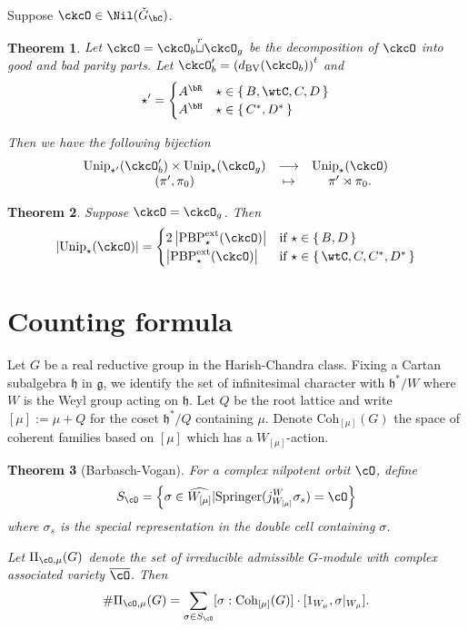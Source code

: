 \documentclass[12pt,a4paper]{amsart}
\def\abs#1{\left|{#1}\right|}
\numberwithin{equation}{section}
\newtheorem{thm}{Theorem}[section]
\theoremstyle{remark}
\def\Unip{\mathrm{Unip}}
\def\ckG{\check{G}}
\def\dBV{d_{\mathrm{BV}}}
\def\cuprow{{\stackrel{r}{\sqcup}}}
\def\Spr{\mathrm{Springer}}
\def\PBPes{\mathrm{PBP}^{\mathrm{ext}}_{\star}}
\begin{document}
Suppose $\ckcO\in \Nil(\ckG_{\bC})$.

\begin{thm}
  Let
  $\ckcO = \ckcO_{b}\cuprow \ckcO_{g}$ be the decomposition of $\ckcO$ into
  good and bad parity parts.
  Let $\ckcO'_{b} = \left(\dBV(\ckcO_{b})\right)^{t}$ and
  \[\star' =
  \begin{cases}
     A^{\bR} & \star \in \set{B,\wtC,C,D}\\
     A^{\bH} & \star \in \set{C^{*},D^{*}}\\
    \end{cases}
  \]

  Then we have the following bijection
  \[
    \begin{array}{ccc}
    \Unip_{\star'}(\ckcO'_{b}) \times \Unip_{\star}(\ckcO_{g})
      & \longrightarrow & \Unip_{\star}(\ckcO)\\
      (\pi',\pi_{0})& \mapsto & \pi'\rtimes \pi_{0}.
    \end{array}
  \]
\end{thm}

\begin{thm}
  Suppose $\ckcO = \ckcO_{g}$. Then
  \[
    \abs{\Unip_{\star}(\ckcO)} = \begin{cases}
      2 \abs{\PBPes(\ckcO)} & \text{if } \star \in \set{B,D}\\
      \abs{\PBPes(\ckcO)} & \text{if } \star \in \set{\wtC,C,C^{*}, D^{*}}
      \end{cases}
  \]
\end{thm}


\section{Counting formula}

Let $G$ be a real reductive group in the Harish-Chandra class.
Fixing a Cartan subalgebra $\mathfrak h$ in $\mathfrak g$,
we identify the set of infinitesimal character with $\mathfrak h^{*}/W$
where $W$ is the Weyl group acting on $\mathfrak h$.
Let $Q$ be the root lattice and write $[\mu]:= \mu+Q$ for the coset
$\mathfrak h^{*}/Q$ containing $\mu$.
Denote
$\mathrm{Coh}_{[\mu]}(G)$ the space of coherent families based on $[\mu]$ which has a $W_{[\mu]}$-action.

\begin{thm}[Barbasch-Vogan]\label{thm:count}
  For a complex nilpotent orbit $\cO$,
  define
  \[
    S_{\cO} = \left\{\sigma \in \widehat{W_{[\mu]}}|
      \Spr(j_{W_{[\mu]}}^{W} \sigma_{s}) = \cO
    \right\}
  \]
  where $\sigma_{s}$ is the special representation in the double cell containing
  $\sigma$.

  Let $\Pi_{\cO,\mu}(G)$ denote the set of irreducible admissible $G$-module with
  complex associated variety $\overline{\cO}$.
  Then
  \[
    \# \Pi_{\cO,\mu}(G) =
    \sum_{\sigma\in S_{\cO}} [\sigma: \mathrm{Coh}_{[\mu]}(G)] \cdot
    [1_{W_{\mu}}, \sigma|_{W_{\mu}}].
  \]
\end{thm}
\end{document}
